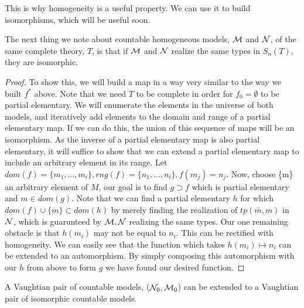 This is why homogeneity is a useful property. We can use it to build isomorphisms, which will be useful soon. 

\begin{lemma}\label{lemma_types_isomorphism}
The next thing we note about countable homogeneous models, \(\mathcal{M}\) and \(\mathcal{N}\), of the same complete theory, \(T\), is that if \(\mathcal{M}\) and \(\mathcal{N}\) realize the same types in \(S_n(T)\), they are isomorphic.
\end{lemma}

\begin{proof}\label{proof_types_isomorphism}
To show this, we will build a map in a way very similar to the way we built \(f^*\) above. 
Note that we need \(T\) to be complete in order for \(f_0=\emptyset\) to be partial elementary.
We will enumerate the elements in the universe of both models, and iteratively add elements to the domain and range of a partial elementary map. 
If we can do this, the union of this sequence of maps will be an isomorphism.
As the inverse of a partial elementary map is also partial elementary, it will suffice to show that we can extend a partial elementary map to include an arbitrary element in its range. 
Let \(dom(f) = \{m_1, \ldots, m_i\}, rng(f) = \{n_1, \ldots, n_i\}, f(m_j) = n_j\).
Now, choose \{m\} an arbitrary element of \(M\), our goal is to find \(g \supset f\) which is partial elementary and \(m \in dom(g)\).
Note that we can find a partial elementary \(h\) for which \(dom(f) \cup \{m\} \subset dom(h)\) by merely finding the realization of \(tp(\bar{m}, m)\) in \(\mathcal{N}\), which is guarunteed by \(\mathcal{M}, \mathcal{N}\) realizing the same types. 
Our one remaining obstacle is that \(h(m_i)\) may not be equal to \(n_i\). 
This can be rectified with homogeneity. We can easily see that the function which takes \(h(m_i) \mapsto n_i\) can be extended to an automorphism. 
By simply composing this automorphism with our \(h\) from above to form \(g\) we have found our desired function. 
\end{proof}


\begin{theorem}\label{theorem_vaughtian_pairs_countable_isomorphic}
A Vaughtian pair of countable models, (\(\mathcal{N}_0, \mathcal{M}_0\)) can be extended to a Vaughtian pair of isomorphic countable models.
\end{theorem}

